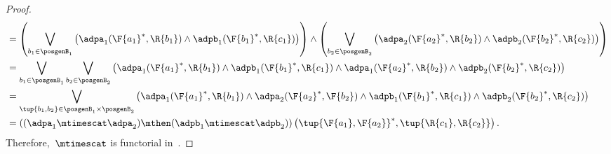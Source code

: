 \begin{proof}
\begin{equation}
\begin{aligned}
      &=\left(\bigvee_{b_1\in \posgenB_1}\left( \adpa_1(\F{a_1}^*,\R{b_1})\wedge \adpb_1(\F{b_1}^*,\R{c_1})\right)\right) \wedge\left(\bigvee_{b_2\in \posgenB_2}\left( \adpa_2(\F{a_2}^*,\R{b_2})\wedge \adpb_2(\F{b_2}^*,\R{c_2})\right)\right)\\
      &=\bigvee_{b_1\in \posgenB_1}\bigvee_{b_2\in \posgenB_2} \left(\adpa_1(\F{a_1}^*,\R{b_1})\wedge \adpb_1(\F{b_1}^*,\R{c_1})\wedge \adpa_1(\F{a_2}^*,\R{b_2})\wedge \adpb_2(\F{b_2}^*,\R{c_2}) \right)\\
      &=\bigvee_{\tup{b_1,b_2}\in \posgenB_1\times \posgenB_2} \left(\adpa_1(\F{a_1}^*,\R{b_1})\wedge \adpa_2(\F{a_2}^*,\F{b_2})\wedge \adpb_1(\F{b_1}^*,\R{c_1})\wedge \adpb_2(\F{b_2}^*,\R{c_2}) \right)\\
      &=\left( (\adpa_1\mtimescat \adpa_2)\mthen (\adpb_1\mtimescat \adpb_2)\right)\left(\tup{\F{a_1},\F{a_2}}^*,\tup{\R{c_1},\R{c_2}} \right).
    \end{aligned}
  \end{equation}
  Therefore,~$\mtimescat$ is functorial in~\DP.
\end{proof}


